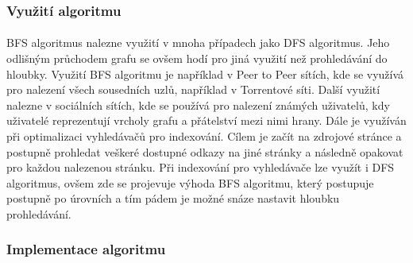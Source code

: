 \documentclass[12pt, titlepage, a4paper]{article}
\begin{document}
\subsubsection{Využití algoritmu}
\paragraph{}
BFS algoritmus nalezne využití v mnoha případech jako DFS algoritmus. Jeho odlišným průchodem grafu se ovšem hodí 
pro jiná využití než prohledávání do hloubky. Využití BFS algoritmu je například v Peer to Peer sítích, kde se 
využívá pro nalezení všech sousedních uzlů, například v Torrentové síti. Další využití nalezne v sociálních sítích,
kde se používá pro nalezení známých uživatelů, kdy uživatelé reprezentují vrcholy grafu a přátelství mezi nimi hrany.
Dále je využíván při optimalizaci vyhledávačů pro indexování. Cílem je začít na zdrojové stránce a postupně prohledat 
veškeré dostupné odkazy na jiné stránky a následně opakovat pro každou nalezenou stránku. Při indexování pro vyhledávače 
lze využít i DFS algoritmus, ovšem zde se projevuje výhoda BFS algoritmu, který postupuje postupně po úrovních a tím pádem 
je možné snáze nastavit hloubku prohledávání.

\subsubsection{Implementace algoritmu}
\end{document}

